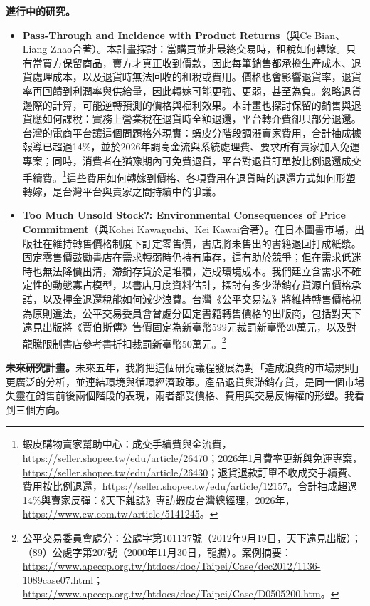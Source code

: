 \documentclass[11pt,letterpaper]{article}
\begin{document}
\medskip
\noindent\textbf{進行中的研究。}
\begin{itemize}[leftmargin=1.6em,itemsep=0.2em,topsep=0.1em,parsep=0.1em]
\item \textbf{Pass-Through and Incidence with Product Returns}（與Ce Bian、Liang Zhao合著）。本計畫探討：當購買並非最終交易時，租稅如何轉嫁。只有當買方保留商品，賣方才真正收到價款，因此每筆銷售都承擔生產成本、退貨處理成本，以及退貨時無法回收的租稅或費用。價格也會影響退貨率，退貨率再回饋到利潤率與供給量，因此轉嫁可能更強、更弱，甚至為負。忽略退貨邊際的計算，可能逆轉預測的價格與福利效果。本計畫也探討保留的銷售與退貨應如何課稅：實務上營業稅在退貨時全額退還，平台轉介費卻只部分退還。台灣的電商平台讓這個問題格外現實：蝦皮分階段調漲賣家費用，合計抽成據報導已超過14\%，並於2026年調高金流與系統處理費、要求所有賣家加入免運專案；同時，消費者在猶豫期內可免費退貨，平台對退貨訂單按比例退還成交手續費。\footnote{蝦皮購物賣家幫助中心：成交手續費與金流費，\url{https://seller.shopee.tw/edu/article/26470}；2026年1月費率更新與免運專案，\url{https://seller.shopee.tw/edu/article/26430}；退貨退款訂單不收成交手續費、費用按比例退還，\url{https://seller.shopee.tw/edu/article/12157}。合計抽成超過14\%與賣家反彈：《天下雜誌》專訪蝦皮台灣總經理，2026年，\url{https://www.cw.com.tw/article/5141245}。}這些費用如何轉嫁到價格、各項費用在退貨時的退還方式如何形塑轉嫁，是台灣平台與賣家之間持續中的爭議。
\item \textbf{Too Much Unsold Stock?: Environmental Consequences of Price Commitment}（與Kohei Kawaguchi、Kei Kawai合著）。在日本圖書市場，出版社在維持轉售價格制度下訂定零售價，書店將未售出的書籍退回打成紙漿。固定零售價鼓勵書店在需求轉弱時仍持有庫存，這有助於競爭；但在需求低迷時也無法降價出清，滯銷存貨於是堆積，造成環境成本。我們建立含需求不確定性的動態寡占模型，以書店月度資料估計，探討有多少滯銷存貨源自價格承諾，以及押金退還稅能如何減少浪費。台灣《公平交易法》將維持轉售價格視為原則違法，公平交易委員會曾處分固定書籍轉售價格的出版商，包括對天下遠見出版將《賈伯斯傳》售價固定為新臺幣599元裁罰新臺幣20萬元，以及對龍騰限制書店參考書折扣裁罰新臺幣50萬元。\footnote{公平交易委員會處分：公處字第101137號（2012年9月19日，天下遠見出版）；（89）公處字第207號（2000年11月30日，龍騰）。案例摘要：\url{https://www.apeccp.org.tw/htdocs/doc/Taipei/Case/dec2012/1136-1089case07.html}；\url{https://www.apeccp.org.tw/htdocs/doc/Taipei/Case/D0505200.htm}。}
\end{itemize}

\medskip
\noindent\textbf{未來研究計畫。}未來五年，我將把這個研究議程發展為對「造成浪費的市場規則」更廣泛的分析，並連結環境與循環經濟政策。產品退貨與滯銷存貨，是同一個市場失靈在銷售前後兩個階段的表現，兩者都受價格、費用與交易反悔權的形塑。我看到三個方向。
\end{document}
